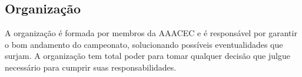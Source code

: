 \subsection{Organização}

A organização é formada por membros da AAACEC e é responsável por garantir o bom andamento do campeonato, solucionando possíveis eventualidades que surjam. A organização tem total poder para tomar qualquer decisão que julgue necessário para cumprir suas responsabilidades.